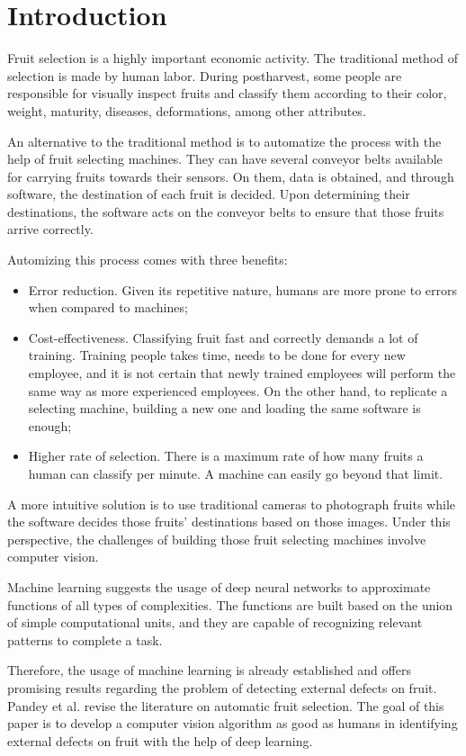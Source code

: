 \documentclass[../main.tex]{subfile}
\begin{document}
\section{Introduction} \label{sec:introduction}
Fruit selection is a highly important economic activity. The traditional method of selection is made by human labor. During postharvest, some people are responsible for visually inspect fruits and classify them according to their color, weight, maturity, diseases, deformations, among other attributes.

An alternative to the traditional method is to automatize the process with the help of fruit selecting machines. They can have several conveyor belts available for carrying fruits towards their sensors. On them, data is obtained, and through software, the destination of each fruit is decided. Upon determining their destinations, the software acts on the conveyor belts to ensure that those fruits arrive correctly.

Automizing this process comes with three benefits:
\begin{itemize}
    \item Error reduction. Given its repetitive nature, humans are more prone to errors when compared to machines;

    \item Cost-effectiveness. Classifying fruit fast and correctly demands a lot of training. Training people takes time, needs to be done for every new employee, and it is not certain that newly trained employees will perform the same way as more experienced employees. On the other hand, to replicate a selecting machine, building a new one and loading the same software is enough;

    \item Higher rate of selection. There is a maximum rate of how many fruits a human can classify per minute. A machine can easily go beyond that limit.
\end{itemize}

A more intuitive solution is to use traditional cameras to photograph fruits while the software decides those fruits' destinations based on those images. Under this perspective, the challenges of building those fruit selecting machines involve computer vision.

Machine learning suggests the usage of deep neural networks to approximate functions of all types of complexities. The functions are built based on the union of simple computational units, and they are capable of recognizing relevant patterns to complete a task.

Therefore, the usage of machine learning is already established and offers promising results regarding the problem of detecting external defects on fruit. Pandey et al. \cite{I-item1} revise the literature on automatic fruit selection. The goal of this paper is to develop a computer vision algorithm as good as humans in identifying external defects on fruit with the help of deep learning.
\end{document}
